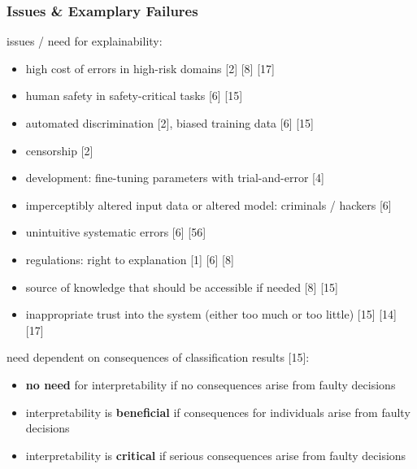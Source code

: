 \subsubsection{Issues \& Examplary Failures}
issues / need for explainability:
\begin{itemize}
	\item high cost of errors in high-risk domains [2] [8] [17]
	\item human safety in safety-critical tasks [6] [15]
	\item automated discrimination [2], biased training data [6] [15]
	\item censorship [2]
	\item development: fine-tuning parameters with trial-and-error [4]
	\item imperceptibly altered input data or altered model: criminals / hackers [6]
	\item unintuitive systematic errors [6] [56]
	\item regulations: right to explanation [1] [6] [8]
	\item source of knowledge that should be accessible if needed [8] [15]
	\item inappropriate trust into the system (either too much or too little) [15] [14] [17]
\end{itemize}
need dependent on consequences of classification results [15]:
\begin{itemize}
	\item \textbf{no need} for interpretability if no consequences arise from faulty decisions
	\item interpretability is \textbf{beneficial} if consequences for individuals arise from faulty decisions
	\item interpretability is \textbf{critical} if serious consequences arise from faulty decisions
\end{itemize}



